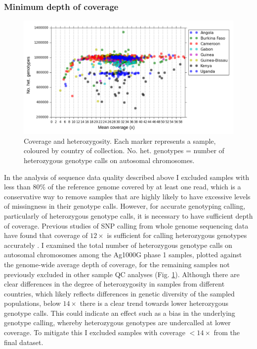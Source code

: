 \documentclass[a4paper,11pt,abstracton,hidelinks]{scrartcl}
\begin{document}
\subsubsection{Minimum depth of coverage}


\begin{figure}[t!]
\centering
\includegraphics[width=\textwidth]{artwork/chapter3/coverage_hetz.pdf}
\caption{Coverage and heterozygosity.
%
Each marker represents a sample, coloured by country of collection.
%
No. het. genotypes = number of heterozygous genotype calls on autosomal chromosomes.
%
}
%
\label{fig:coverage_hetz}
\end{figure}


In the analysis of sequence data quality described above I excluded samples with less than 80\% of the reference genome covered by at least one read, which is a conservative way to remove samples that are highly likely to have excessive levels of missingness in their genotype calls.
%
However, for accurate genotyping calling, particularly of heterozygous genotype calls, it is necessary to have sufficient depth of coverage.
%
Previous studies of SNP calling from whole genome sequencing data have found that coverage of $12\times$ is sufficient for calling heterozygous genotypes accurately \citep{Meynert2014}.
%
I examined the total number of heterozygous genotype calls on autosomal chromosomes among the Ag1000G phase 1 samples, plotted against the genome-wide average depth of coverage, for the remaining samples not previously excluded in other sample QC analyses (Fig. \ref{fig:coverage_hetz}).
%
Although there are clear differences in the degree of heterozygosity in samples from different countries, which likely reflects differences in genetic diversity of the sampled populations, below $14\times$ there is a clear trend towards lower heterozygous genotype calls.
%
This could indicate an effect such as a bias in the underlying genotype calling, whereby heterozygous genotypes are undercalled at lower coverage.
%
To mitigate this I excluded samples with coverage $<14\times$ from the final dataset.
\end{document}
